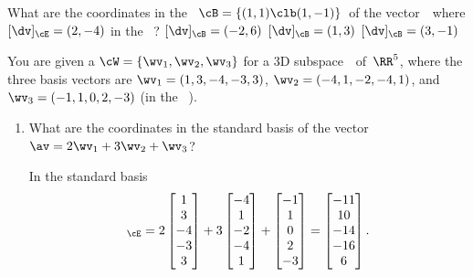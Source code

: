 \begin{activity}
What are the coordinates in the ~\(\cB=\{(1,1)\clb (1,-1)\}\)\ of the vector~\dv\ where \([\dv]_\cE=(2,-4)\) in the ~\cE?
{\([\dv]_\cB=(-2,6)\)}
{\([\dv]_\cB=(1,3)\)}
{\([\dv]_\cB=(3,-1)\)}
\end{activity}





\begin{example} 
You are given a  \(\cW=\{\wv_1,\wv_2,\wv_3\}\) for a 3D subspace~\WW\ of~\(\RR^5\), where the three basis vectors are
\(\wv_1=(1,3,-4,-3,3)\),
\(\wv_2=(-4,1,-2,-4,1)\), and
\(\wv_3=(-1,1,0,2,-3)\) (in the ~\cE).
\begin{enumerate}
\item What are the coordinates in the standard basis of the vector \(\av=2\wv_1+3\wv_2+\wv_3\)?
\begin{solution} 
In the standard basis
\begin{equation*}
[\av]_\cE=2\begin{bmatrix} 1\\3\\-4\\-3\\3 \end{bmatrix}
+3\begin{bmatrix} -4\\1\\-2\\-4\\1 \end{bmatrix}
+\begin{bmatrix} -1\\1\\0\\2\\-3 \end{bmatrix}
=\begin{bmatrix} -11\\ 10\\-14\\-16\\  6 \end{bmatrix}.
\end{equation*}
\end{solution}


\end{enumerate}
\end{example}
